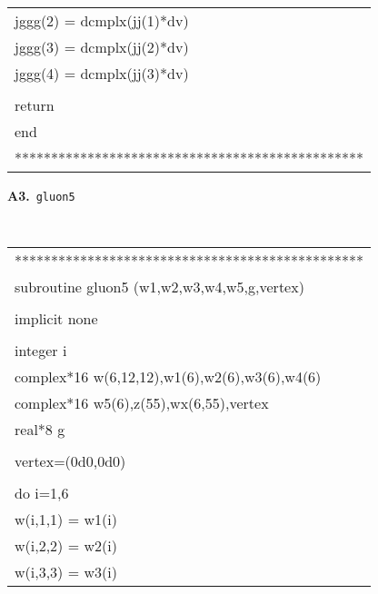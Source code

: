 \begin{center}
{\begin{supertabular}{l}
      \hspace{0.5em} jggg(2) = dcmplx(jj(1)*dv)\\
      \hspace{0.5em} jggg(3) = dcmplx(jj(2)*dv)\\
      \hspace{0.5em} jggg(4) = dcmplx(jj(3)*dv)\\
\\
      \hspace{0.5em} return\\
      \hspace{0.5em} end\\
************************************************\\
\end{supertabular}
}

{\bf A3.}~{\tt gluon5}\\
{\tt
\begin{supertabular}{l}
************************************************\\
      \hspace{0.5em} subroutine gluon5 (w1,w2,w3,w4,w5,g,vertex)\\
\\
     \hspace{0.5em} implicit none\\
\\
     \hspace{0.5em} integer i\\
     \hspace{0.5em} complex*16 w(6,12,12),w1(6),w2(6),w3(6),w4(6)\\
     \hspace{0.5em} complex*16 w5(6),z(55),wx(6,55),vertex    \\
     \hspace{0.5em} real*8 g    \\
      \\
     \hspace{0.5em} vertex=(0d0,0d0)     \\
\\
     \hspace{0.5em} do i=1,6\\
     \hspace{1em}    w(i,1,1) = w1(i)\\
     \hspace{1em}    w(i,2,2) = w2(i)\\
     \hspace{1em}    w(i,3,3) = w3(i)\\

\end{supertabular}}
\end{center}
